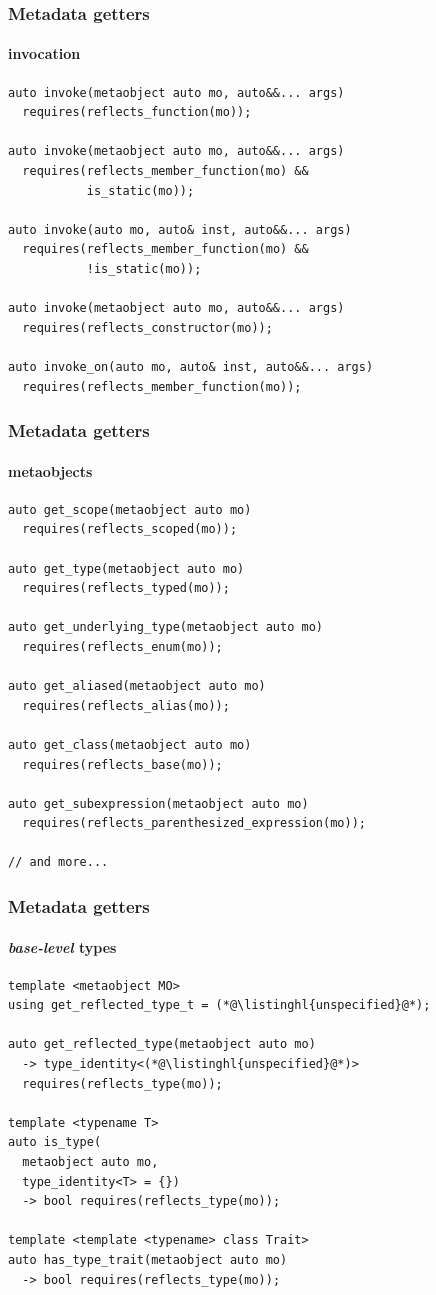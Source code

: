 \documentclass[compress,table,xcolor=table]{beamer}
\begin{document}
\begin{frame}[fragile]
  \frametitle{Metadata getters}
  \framesubtitle{invocation}
  \begin{lstlisting}[language=c++2x,basicstyle=\footnotesize\ttfamily]
auto invoke(metaobject auto mo, auto&&... args)
  requires(reflects_function(mo));

auto invoke(metaobject auto mo, auto&&... args)
  requires(reflects_member_function(mo) &&
           is_static(mo));

auto invoke(auto mo, auto& inst, auto&&... args)
  requires(reflects_member_function(mo) &&
           !is_static(mo));

auto invoke(metaobject auto mo, auto&&... args)
  requires(reflects_constructor(mo));

auto invoke_on(auto mo, auto& inst, auto&&... args)
  requires(reflects_member_function(mo));
  \end{lstlisting}
\end{frame}
\begin{frame}[fragile]
  \frametitle{Metadata getters}
  \framesubtitle{metaobjects}
 \begin{lstlisting}[language=c++2x,basicstyle=\footnotesize\ttfamily]
auto get_scope(metaobject auto mo)
  requires(reflects_scoped(mo));

auto get_type(metaobject auto mo)
  requires(reflects_typed(mo));

auto get_underlying_type(metaobject auto mo)
  requires(reflects_enum(mo));

auto get_aliased(metaobject auto mo)
  requires(reflects_alias(mo));

auto get_class(metaobject auto mo)
  requires(reflects_base(mo));

auto get_subexpression(metaobject auto mo)
  requires(reflects_parenthesized_expression(mo));

// and more...
  \end{lstlisting}
\end{frame}
\begin{frame}[fragile]
  \frametitle{Metadata getters}
  \framesubtitle{{\em base-level} types}
 \begin{lstlisting}[language=c++2x,basicstyle=\footnotesize\ttfamily]
template <metaobject MO>
using get_reflected_type_t = (*@\listinghl{unspecified}@*);

auto get_reflected_type(metaobject auto mo)
  -> type_identity<(*@\listinghl{unspecified}@*)>
  requires(reflects_type(mo));

template <typename T>
auto is_type(
  metaobject auto mo,
  type_identity<T> = {})
  -> bool requires(reflects_type(mo));

template <template <typename> class Trait>
auto has_type_trait(metaobject auto mo) 
  -> bool requires(reflects_type(mo));

  \end{lstlisting}
\end{frame}
\end{document}
